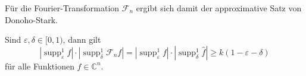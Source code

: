 Für die Fourier-Transformation $\mathscr{F}_n$ ergibt sich damit 
der approximative Satz von Donoho-Stark.

\begin{satz}
Sind $\varepsilon,\delta\in[0,1)$, dann gilt
\[
|\operatorname{supp}_\varepsilon^1 f|
\cdot
|\operatorname{supp}_\delta^1 \mathscr{F}_nf|
=
|\operatorname{supp}_\varepsilon^1 f|
\cdot
|\operatorname{supp}_\delta^1 \hat{f}|
\ge
k(1-\varepsilon-\delta)
\]
für alle Funktionen $f\in\mathbb{C}^n$.
\end{satz}


